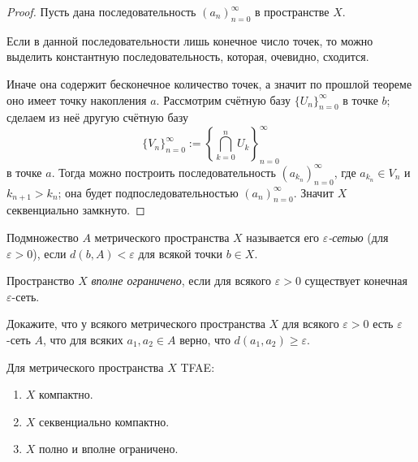 \documentclass[12pt,a4paper]{article}
\begin{document}
    \begin{proof}
        Пусть дана последовательность $(a_n)_{n=0}^\infty$ в пространстве $X$.
        
        Если в данной последовательности лишь конечное число точек, то можно выделить константную последовательность, которая, очевидно, сходится.
        
        Иначе она содержит бесконечное количество точек, а значит по прошлой теореме оно имеет точку накопления $a$. Рассмотрим счётную базу $\{U_n\}_{n=0}^\infty$ в точке $b$; сделаем из неё другую счётную базу
        \[\{V_n\}_{n=0}^\infty := \left\{\bigcap_{k=0}^n U_k\right\}_{n=0}^\infty\]
        в точке $a$. Тогда можно построить последовательность $(a_{k_n})_{n=0}^\infty$, где $a_{k_n} \in V_n$ и $k_{n+1} > k_n$; она будет подпоследовательностью $(a_n)_{n=0}^\infty$. Значит $X$ секвенциально замкнуто.
    \end{proof}
    
    \begin{definition}
        Подмножество $A$ метрического пространства $X$ называется его \emph{$\varepsilon$-сетью} (для $\varepsilon > 0$), если $d(b, A) < \varepsilon$ для всякой точки $b \in X$.
    \end{definition}

    \begin{definition}
        Пространство $X$ \emph{вполне ограничено}, если для всякого $\varepsilon > 0$ существует конечная $\varepsilon$-сеть.
    \end{definition}

    \begin{exercise}
        Докажите, что у всякого метрического пространства $X$ для всякого $\varepsilon > 0$ есть $\varepsilon$-сеть $A$, что для всяких $a_1, a_2 \in A$ верно, что $d(a_1, a_2) \geqslant \varepsilon$.
    \end{exercise}

    \begin{theorem}\label{compact_tern_theorem}
        Для метрического пространства $X$ TFAE:
        \begin{multicols}{3}
            \begin{enumerate}
                \item $X$ компактно.
                \item $X$ секвенциально компактно.
                \item $X$ полно и вполне ограничено.
            \end{enumerate}
        \end{multicols}
    \end{theorem}
    
\end{document}
